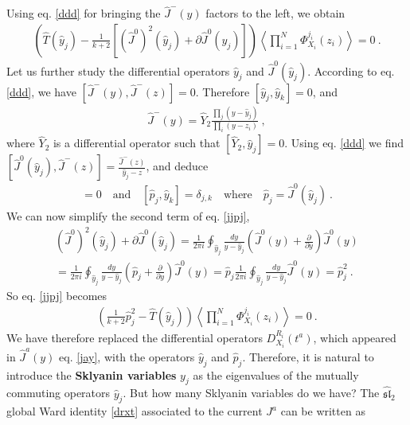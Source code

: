 \documentclass[12pt,a4paper,notitlepage]{report}
\numberwithin{equation}{section}
\theoremstyle{break}
\begin{document}
Using eq. \eqref{ddd} for bringing the $\hat{J}^-(y)$ factors to the left, we obtain
\begin{align}
 \left( \hat{T}(\hat{y}_j) -\frac{1}{k+2}\left[(\hat{J}^0)^2(\hat{y}_j) + \partial \hat{J}^0(\hat{y}_j)\right] \right)  \left\langle \prod_{i=1}^N \Phi^{j_i}_{X_i}(z_i)\right\rangle= 0 \ .
\label{jjpj}
\end{align}
Let us further study the differential operators $\hat{y}_j$ and $\hat{J}^0(\hat{y}_j)$.
According to eq. \eqref{ddd}, we have $[\hat{J}^-(y),\hat{J}^-(z)]=0$.
Therefore $[\hat{y}_j,\hat{y}_k]=0$, and
\begin{align}
 \boxed{\hat{J}^-(y)  = \hat{Y}_2 \frac{\prod_{j}(y-\hat{y}_j)}{\prod_i(y-z_i)}}\ ,
\label{djm}
\end{align}
where $\hat{Y}_2$ is a differential operator such that $[\hat{Y}_2,\hat{y}_j]=0$.
Using eq. \eqref{ddd} we find $[\hat{J}^0(\hat{y}_j),\hat{J}^-(z)] = \frac{\hat{J}^-(z)}{\hat{y}_j-z}$, and deduce
\begin{align}
 [\hat{p}_j,\hat{Y}_2]=0 \quad \text{and} \quad [\hat{p}_j,\hat{y}_k]=\delta_{j,k} \quad \text{where} \quad \hat{p}_j = \hat{J}^0(\hat{y}_j)\ .
\label{pyd}
\end{align}
We can now simplify the second term of eq. \eqref{jjpj},
\begin{multline}
 (\hat{J}^0)^2(\hat{y}_j) + \partial \hat{J}^0(\hat{y}_j) = \frac{1}{2\pi i} \oint_{\hat{y}_j} \frac{dy}{y-\hat{y}_j}\left(\hat{J}^0(y) +{\frac{\partial}{\partial y}} \right) \hat{J}^0(y) \\
 = \frac{1}{2\pi i} \oint_{\hat{y}_j} \frac{dy}{y-\hat{y}_j}\left(\hat{p}_j +{\frac{\partial}{\partial y}} \right) \hat{J}^0(y)
 = \hat{p}_j \frac{1}{2\pi i} \oint_{\hat{y}_j} \frac{dy}{y-\hat{y}_j} \hat{J}^0(y) = \hat{p}_j^2\ .
\end{multline}
So eq. \eqref{jjpj} becomes 
\begin{align}
 \boxed{\left(\frac{1}{k+2}\hat{p}_j^2 -\hat{T}(\hat{y}_j)\right) \left\langle \prod_{i=1}^N \Phi^{j_i}_{X_i}(z_i)\right\rangle= 0 }\ .
\label{ppdz}
\end{align}
We have therefore replaced the differential operators $D^{R_i}_{X_i}(t^a)$, which appeared in $\hat{J}^a(y)$ eq. \eqref{jay}, with the operators $\hat{y}_j$ and $\hat{p}_j$.
Therefore, it is natural to introduce the
\textbf{\boldmath Sklyanin variables} $y_j$ as the eigenvalues of the mutually commuting operators $\hat{y}_j$. 
But how many Sklyanin variables do we have? 
The $\widehat{\mathfrak{sl}}_2$ global Ward identity \eqref{drxt} associated to the current $J^a$ can be written as 
\end{document}
